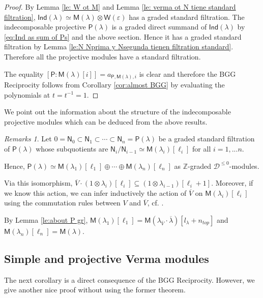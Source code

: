 \documentclass[reqno]{amsart}
\newcommand{\oV}{\overline{V}}
\renewcommand{\_}[1]{_{\left( #1 \right)}}
\renewcommand{\^}[1]{^{\left( #1 \right)}}
\newcommand{\ot}{{\otimes}}
\newcommand\fInd{\mathsf{Ind}}
\newcommand\fM{\mathsf{M}}
\newcommand\fN{\mathsf{N}}
\newcommand\fP{\mathsf{P}}
\newcommand\fW{\mathsf{W}}
\newcommand{\Z}{{\mathbb Z}}
\newcommand{\D}{\mathcal{D}}
\theoremstyle{plain}
\theoremstyle{definition}
\theoremstyle{remark}
\newtheorem{rmk}[lema]{Remarks}
\begin{document}
\begin{proof}
By Lemma \ref{le: W ot M} and Lemma \ref{le: verma ot N tiene standard filtration}, $\fInd(\lambda)\simeq\fM(\lambda)\ot\fW(\varepsilon)$ has a graded standard filtration. The indecomposable projective $\fP(\lambda)$ is a graded direct summand of $\fInd(\lambda)$ by \eqref{eq:Ind as sum of Ps} and the above section. Hence it has a graded standard filtration by Lemma \ref{le:N Nprima y Nsegunda tienen filtration standard}. Therefore all the projective modules have a standard filtration. 

The equality $\left[\fP:\fM(\lambda)[i]\right]=a_{\fP,\fM(\lambda),i}$ is clear and therefore the BGG Reciprocity follows from Corollary \ref{cor:almost BGG} by evaluating the polynomials at $t=t^{-1}=1$.
\end{proof}

We point out the information about the structure of the indecomposable projective modules which can be deduced from the above results.

\begin{rmk}
Let $0=\fN_0\subset\fN_1\subset\cdots\subset\fN_n=\fP(\lambda)$ be a graded standard filtration of $\fP(\lambda)$ whose subquotients are $\fN_i/\fN_{i-1}\simeq\fM(\lambda_i)[\ell_i]$ for all $i=1, ... n$. 

\smallskip

Hence, $\fP(\lambda)\simeq\fM(\lambda_1)[\ell_1]\oplus\cdots\oplus\fM(\lambda_n)[\ell_n]$ as $\Z$-graded $\D^{\leq0}$-modules.

\smallskip

Via this isomorphism, $\oV\cdot(1\ot\lambda_i)[\ell_i]\subseteq(1\ot\lambda_{i-1})[\ell_i+1]$. Moreover, if we know this action, we can infer inductively the action of $\oV$ on $\fM(\lambda_i)[\ell_i]$ using the commutation rules between $V$ and $\oV$, cf. \cite[p. 438]{PV2}. 

\smallskip

By Lemma \ref{le:about P gr}, $\fM(\lambda_1)[\ell_1]=\fM(\lambda_{\oV}\cdot\overline{\lambda})[l_\lambda+n_{top}]$ and $\fM(\lambda_n)[\ell_n]=\fM(\lambda)$.
\end{rmk}


\subsection{Simple and projective Verma modules}\label{sec:simple and proj verma}

The next corollary is a direct consequence of the BGG Reciprocity. However, we give another nice proof without using the former theorem.
\end{document}
